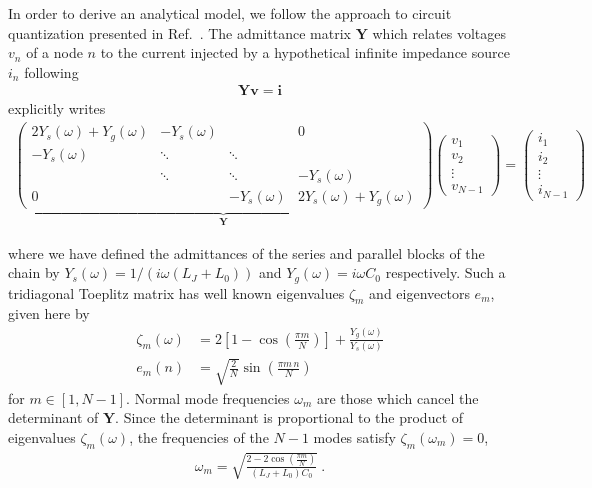 In order to derive an analytical model, we follow the approach to circuit quantization presented in Ref.~\cite{gelyQuCATQuantumCircuit2019}.
%
The admittance matrix $\mathbf{Y}$ which relates voltages $v_n$ of a node $n$ to the current injected by a hypothetical infinite impedance source $i_n$ following 
\begin{align}
\mathbf{Y}\mathbf{v} = \mathbf{i}
\label{eq:v_to_i_relation}
\end{align}
explicitly writes
\begin{align}
\underbrace{\begin{pmatrix} 
	2Y_s(\omega)+Y_g (\omega) & - Y_s(\omega) &  & 0 \\
	- Y_s(\omega) & \ddots & \ddots &  \\
	& \ddots & \ddots & -Y_s(\omega)  \\
	0 &  & -Y_s(\omega) & 2Y_s(\omega)+Y_g (\omega)
	\end{pmatrix}}_{\mathbf{Y}}
\begin{pmatrix}
v_{1} \\
v_{2} \\
\vdots \\
v_{N-1}
\end{pmatrix}
=
\begin{pmatrix}
i_{1} \\
i_{2} \\
\vdots \\
i_{N-1}
\end{pmatrix}
\label{eq:admittance_matrix}
\end{align}

where we have defined the admittances of the series and parallel blocks of the chain by $Y_s(\omega)  = 1/(i \omega (L_J+L_0))$ and $Y_g(\omega)  = i \omega C_0$ respectively.
%
Such a tridiagonal Toeplitz matrix \cite{noscheseTridiagonalToeplitzMatrices2013} has well known eigenvalues $\zeta_m$ and eigenvectors $e_m$, given here by
\begin{align}
\zeta_m(\omega) &=  2 \left[ 1 - \cos \left(\frac{\pi m}{N}\right) \right] + \frac{Y_g(\omega)}{Y_s (\omega)} \\
e_{m}(n) &= \sqrt{\frac{2}{N}} \sin\left(\frac{\pi m \, n}{N}\right)
\end{align}
for $m\in[1,N-1]$.
%
Normal mode frequencies $\omega_m$ are those which cancel the determinant of $\textbf{Y}$.
%
Since the determinant is proportional to the product of eigenvalues $\zeta_m(\omega)$, the frequencies of the $N-1$ modes satisfy $\zeta_m(\omega_m) = 0$,
\begin{align}
\omega_m = \sqrt{\frac{2-2\cos\left(\frac{\pi m}{N}\right)}{(L_J+L_0)C_0}}\ .
\label{eq:anh-wm}
\end{align}


